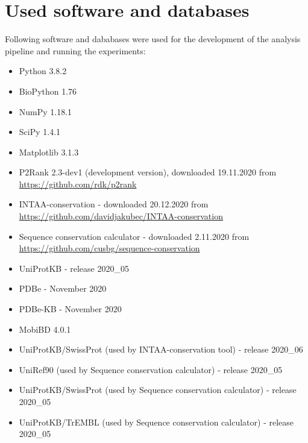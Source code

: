 \documentclass[12pt,a4paper]{report}
\let\openright=\clearpage
\begin{document}
\section{Used software and databases}

Following software and dababases were used for the development of the analysis pipeline and running the experiments:

\begin{itemize}
\item Python 3.8.2
\item BioPython 1.76
\item NumPy 1.18.1
\item SciPy 1.4.1
\item Matplotlib 3.1.3
\item P2Rank 2.3-dev1 (development version), downloaded 19.11.2020 \newline from \url{https://github.com/rdk/p2rank}
\item INTAA-conservation - downloaded 20.12.2020 \newline from \url{https://github.com/davidjakubec/INTAA-conservation}
\item Sequence conservation calculator - downloaded 2.11.2020 \newline from \url{https://github.com/cusbg/sequence-conservation}
\item UniProtKB - release 2020\_05
\item PDBe - November 2020
\item PDBe-KB - November 2020
\item MobiBD 4.0.1
\item UniProtKB/SwissProt (used by INTAA-conservation tool) - release 2020\_06
\item UniRef90 (used by Sequence conservation calculator) - release 2020\_05
\item UniProtKB/SwissProt (used by Sequence conservation calculator) \newline - release 2020\_05
\item UniProtKB/TrEMBL (used by Sequence conservation calculator) \newline - release 2020\_05

\end{itemize}




\openright
\end{document}
